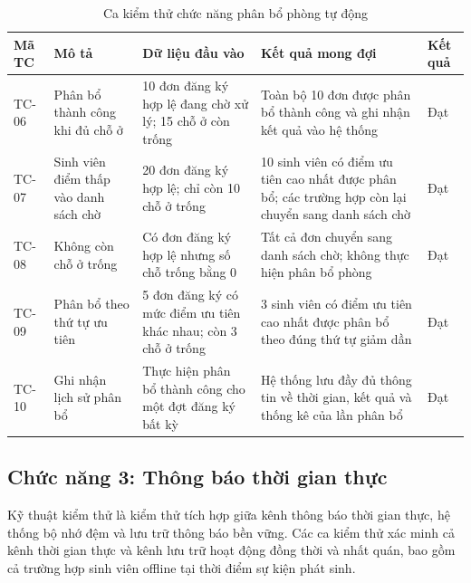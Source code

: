 \documentclass[../DoAn.tex]{subfiles}
\begin{document}
\vspace{-6pt}
\begin{table}[H]
\centering
\caption{Ca kiểm thử chức năng phân bổ phòng tự động}
\label{tab:tc_allocation}
\footnotesize

\begin{tabular}{|p{1.1cm}|p{2.5cm}|p{3.2cm}|p{4.0cm}|p{1.2cm}|}
\hline
\textbf{Mã TC} &
\textbf{Mô tả} &
\textbf{Dữ liệu đầu vào} &
\textbf{Kết quả mong đợi} &
\textbf{Kết quả} \\
\hline

TC-06 &
Phân bổ thành công khi đủ chỗ ở &
10 đơn đăng ký hợp lệ đang chờ xử lý; 15 chỗ ở còn trống &
Toàn bộ 10 đơn được phân bổ thành công và ghi nhận kết quả vào hệ thống &
Đạt \\
\hline

TC-07 &
Sinh viên điểm thấp vào danh sách chờ &
20 đơn đăng ký hợp lệ; chỉ còn 10 chỗ ở trống &
10 sinh viên có điểm ưu tiên cao nhất được phân bổ; các trường hợp còn lại chuyển sang danh sách chờ &
Đạt \\
\hline

TC-08 &
Không còn chỗ ở trống &
Có đơn đăng ký hợp lệ nhưng số chỗ trống bằng 0 &
Tất cả đơn chuyển sang danh sách chờ; không thực hiện phân bổ phòng &
Đạt \\
\hline

TC-09 &
Phân bổ theo thứ tự ưu tiên &
5 đơn đăng ký có mức điểm ưu tiên khác nhau; còn 3 chỗ ở trống &
3 sinh viên có điểm ưu tiên cao nhất được phân bổ theo đúng thứ tự giảm dần &
Đạt \\
\hline

TC-10 &
Ghi nhận lịch sử phân bổ &
Thực hiện phân bổ thành công cho một đợt đăng ký bất kỳ &
Hệ thống lưu đầy đủ thông tin về thời gian, kết quả và thống kê của lần phân bổ &
Đạt \\
\hline

\end{tabular}
\end{table}
\vspace{-4pt}


\subsection*{Chức năng 3: Thông báo thời gian thực}

Kỹ thuật kiểm thử là kiểm thử tích hợp giữa kênh thông
báo thời gian thực, hệ thống bộ nhớ đệm và lưu trữ thông báo bền vững. Các ca
kiểm thử xác minh cả kênh thời gian thực và kênh lưu trữ hoạt động đồng thời
và nhất quán, bao gồm cả trường hợp sinh viên offline tại thời điểm sự kiện
phát sinh.
\end{document}
